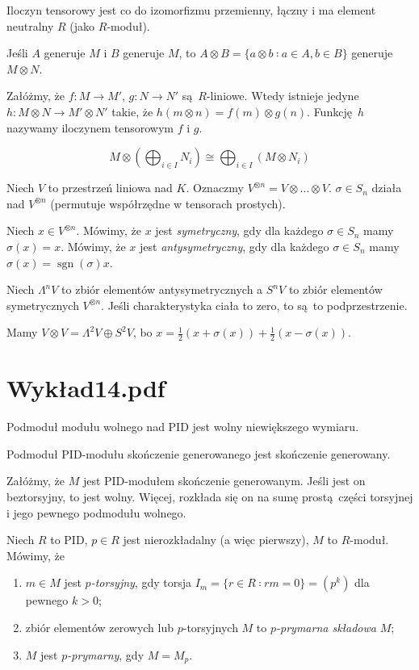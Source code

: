 \documentclass[a4paper, 12pt]{article}
\DeclareMathOperator{\sgn}{sgn}
\newcommand{\+}{\enspace}
\begin{document}
Iloczyn tensorowy jest co do izomorfizmu przemienny, łączny i ma element neutralny
$R$ (jako $R$-moduł).

Jeśli $A$ generuje $M$ i $B$ generuje $M$,
to $A ⊗ B = \{ a⊗b ∶ a ∈ A, b ∈ B \}$
generuje $M ⊗ N$.

Załóżmy, że $f: M → M'$, $g: N → N'$ są $R$-liniowe.
Wtedy istnieje jedyne $h: M ⊗ N → M' ⊗ N'$ takie,
że $h(m⊗n) = f(m)⊗g(n)$.
Funkcję $h$ nazywamy iloczynem tensorowym $f$ i $g$.


$$M ⊗ (\bigoplus_{i∈I} N_i) ≅ \bigoplus_{i∈I} (M⊗N_i)$$

Niech $V$ to przestrzeń liniowa nad $K$.
Oznaczmy $V^{⊗n} = V ⊗ … ⊗ V$.
$σ∈S_n$ działa nad $V^{⊗n}$ (permutuje współrzędne w tensorach prostych).

Niech $x ∈ V^{⊗n}$.
Mówimy, że $x$ jest \textit{symetryczny},
gdy dla każdego $σ∈S_n$ mamy $σ(x) = x$.
Mówimy, że $x$ jest \textit{antysymetryczny},
gdy dla każdego $σ∈S_n$ mamy $σ(x) = \sgn(σ) x$.

Niech $Λ^nV$ to zbiór elementów antysymetrycznych
a $S^nV$ to zbiór elementów symetrycznych $V^{⊗n}$.
Jeśli charakterystyka ciała to zero, to są to podprzestrzenie.

Mamy $V⊗V = Λ^2V ⊕ S^2 V$, bo
$x = \frac{1}{2}(x + σ(x)) + \frac{1}{2}(x-σ(x))$.


\section*{Wykład14.pdf}
Podmoduł modułu wolnego nad PID jest wolny niewiększego wymiaru.

Podmoduł PID-modułu skończenie generowanego jest skończenie generowany.

Załóżmy, że $M$ jest PID-modułem skończenie generowanym.
Jeśli jest on beztorsyjny, to jest wolny.
Więcej, rozkłada się on na sumę prostą części torsyjnej i jego
pewnego podmodułu wolnego.

Niech $R$ to PID,
$p∈R$ jest nierozkładalny (a więc pierwszy),
$M$ to $R$-moduł.
Mówimy, że
\begin{enumerate}
	\item
	$m ∈ M$ jest \textit{$p$-torsyjny},
	gdy torsja $I_m = \{ r ∈ R ∶ rm = 0 \} = (p^k)$ %
	dla pewnego $k > 0$;
	\item
	zbiór elementów zerowych lub $p$-torsyjnych $M$
	to \textit{$p$-prymarna składowa} $M$; %
	\item
	$M$ jest \textit{$p$-prymarny}, gdy $M = M_p$.
\end{enumerate}
\end{document}
